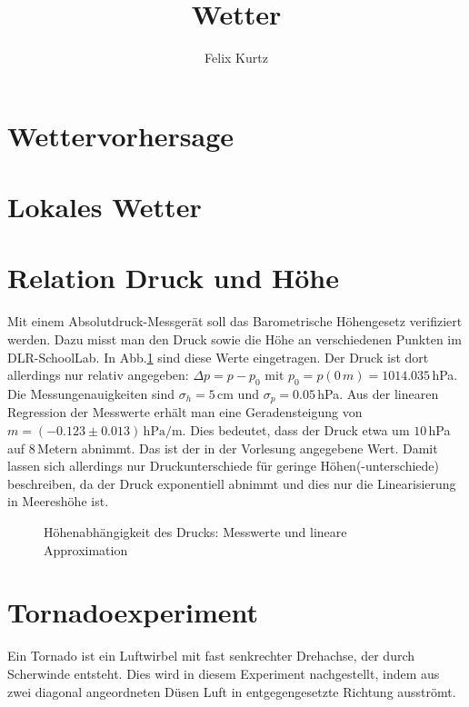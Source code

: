 \documentclass[12pt,a4paper,headinclude,bibtotoc]{scrartcl}
\begin{document}
\title{Wetter}
\author{Felix Kurtz}
\maketitle

\section{Wettervorhersage}

\section{Lokales Wetter}

\section{Relation Druck und Höhe}
Mit einem Absolutdruck-Messgerät soll das Barometrische Höhengesetz verifiziert werden.
Dazu misst man den Druck sowie die Höhe an verschiedenen Punkten im DLR-SchoolLab.
In Abb.\ref{fig:druckHoehe} sind diese Werte eingetragen.
Der Druck ist dort allerdings nur relativ angegeben: $\Delta p = p-p_0$ mit $p_0=p(0\,\si{m})=1014.035\,$hPa.
Die Messungenauigkeiten sind $\sigma_h=5\,$cm und $\sigma_p=0.05\,$hPa.
Aus der linearen Regression der Messwerte erhält man eine Geradensteigung von $m=(-0.123 \pm 0.013)\,\si{\hecto\pascal\per\meter}$.
Dies bedeutet, dass der Druck etwa um $10\,$hPa auf $8\,$Metern abnimmt.
Das ist der in der Vorlesung angegebene Wert.
Damit lassen sich allerdings nur Druckunterschiede für geringe Höhen(-unterschiede) beschreiben, da der Druck exponentiell abnimmt und dies nur die Linearisierung in Meereshöhe ist.
\begin{figure}[!htb]
	\centering
	
	\caption{Höhenabhängigkeit des Drucks: Messwerte und lineare Approximation}
	\label{fig:druckHoehe}
\end{figure}

\section{Tornadoexperiment}
Ein Tornado ist ein Luftwirbel mit fast senkrechter Drehachse, der durch Scherwinde entsteht.
Dies wird in diesem Experiment nachgestellt, indem aus zwei diagonal angeordneten Düsen Luft in entgegengesetzte Richtung ausströmt.
\end{document}
